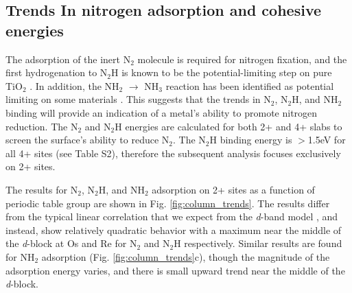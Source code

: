 \subsection{Trends In nitrogen adsorption and cohesive energies}
\label{sec:reactivity}

The adsorption of the inert N$_2$ molecule is required for nitrogen fixation, and the first hydrogenation to N$_2$H is known to be the potential-limiting step on pure TiO$_2$ \cite{Comer_2018}. In addition, the NH$_2$ $\rightarrow$ NH$_3$ reaction has been identified as potential limiting on some materials \cite{Hoskuldsson_2017}. This suggests that the trends in N$_2$, N$_2$H, and NH$_2$ binding will provide an indication of a metal's ability to promote nitrogen reduction. The N$_2$ and N$_2$H energies are calculated for both 2+ and 4+ slabs to screen the surface's ability to reduce N$_2$. The N$_2$H binding energy is $>$1.5eV for all 4+ sites (see Table S2), therefore the subsequent analysis focuses exclusively on 2+ sites.

The results for N$_2$, N$_2$H, and NH$_2$ adsorption on 2+ sites as a function of periodic table group are shown in Fig. \ref{fig:column_trends}. The results differ from the typical linear correlation that we expect from the \textit{d}-band model \cite{Nilsson_2008}, and instead, show relatively quadratic behavior with a maximum near the middle of the \textit{d}-block at Os and Re  for N$_2$ and N$_2$H respectively. Similar results are found for NH$_2$ adsorption (Fig. \ref{fig:column_trends}c), though the magnitude of the adsorption energy varies, and there is small upward trend near the middle of the \textit{d}-block. 


